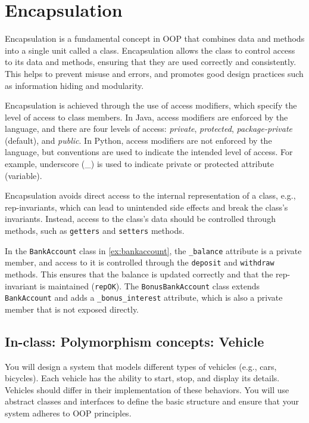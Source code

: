 \documentclass[oneside,11pt,dvipsnames]{book}
\newcommand{\code}[1]{\texttt{#1}}
\begin{document}
\section{Encapsulation}
Encapsulation is a fundamental concept in OOP that combines data and methods into a single unit called a class. Encapsulation allows the class to control access to its data and methods, ensuring that they are used correctly and consistently. This helps to prevent misuse and errors, and promotes good design practices such as information hiding and modularity.

Encapsulation is achieved through the use of access modifiers, which specify the level of access to class members. In Java, access modifiers are enforced by the language, and there are four levels of access: \emph{private}, \emph{protected}, \emph{package-private} (default), and \emph{public}.  In Python, access modifiers are not enforced by the language, but conventions are used to indicate the intended level of access. For example, underscore (\_) is used to indicate private or protected attribute (variable). %

Encapsulation avoids direct access to the internal representation of a class, e.g., rep-invariants, which can lead to unintended side effects and break the class's invariants. Instead, access to the class's data should be controlled through methods, such as \code{getters} and \code{setters} methods.

In the \code{BankAccount} class in \autoref{ex:bankaccount}, the \code{\_balance} attribute is a private member, and access to it is controlled through the \code{deposit} and \code{withdraw} methods. This ensures that the balance is updated correctly and that the rep-invariant is maintained (\code{repOK}). The \code{BonusBankAccount} class extends \code{BankAccount} and adds a \code{\_bonus\_interest} attribute, which is also a private member that is not exposed directly. 



\subsection{In-class: Polymorphism concepts: Vehicle}

You will design a system that models different types of vehicles (e.g., cars, bicycles). Each vehicle has the ability to start, stop, and display its details. Vehicles should differ in their implementation of these behaviors. You will use abstract classes and interfaces to define the basic structure and ensure that your system adheres to OOP principles.
\end{document}

